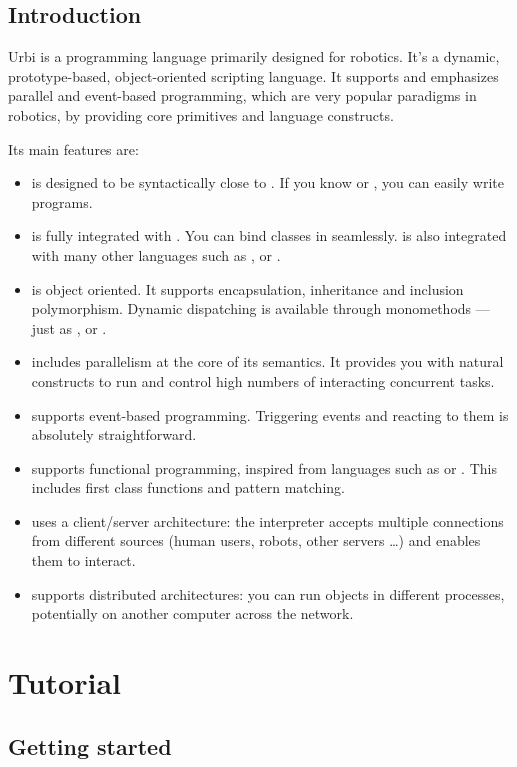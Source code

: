 \chapter{Introduction}

Urbi is a programming language primarily designed for robotics. It's a
dynamic, prototype-based, object-oriented scripting language. It
supports and emphasizes parallel and event-based programming, which
are very popular paradigms in robotics, by providing core primitives
and language constructs.

Its main features are:
\begin{itemize}
\item \urbi is designed to be syntactically close to \Cxx. If you know
  \C or \Cxx, you can easily write \urbi programs.
\item \urbi is fully integrated with \Cxx. You can bind \Cxx classes
  in \urbi seamlessly. \urbi is also integrated with many other
  languages such as \java, \matlab or \python.
\item \urbi is object oriented. It supports encapsulation, inheritance
  and inclusion polymorphism. Dynamic dispatching is available through
  monomethods --- just as \Cxx, \Cs or \java.
\item \urbi includes parallelism at the core of its semantics. It
  provides you with natural constructs to run and control high numbers
  of interacting concurrent tasks.
\item \urbi supports event-based programming. Triggering events and
  reacting to them is absolutely straightforward.
\item \urbi supports functional programming, inspired from languages
  such as \lisp or \caml. This includes first class functions and
  pattern matching.
\item \urbi uses a client/server architecture: the interpreter accepts
  multiple connections from different sources (human users, robots,
  other servers \ldots) and enables them to interact.
\item \urbi supports distributed architectures: you can run objects in
  different processes, potentially on another computer across the
  network.
\end{itemize}

\part{Tutorial}

\chapter{Getting started}

